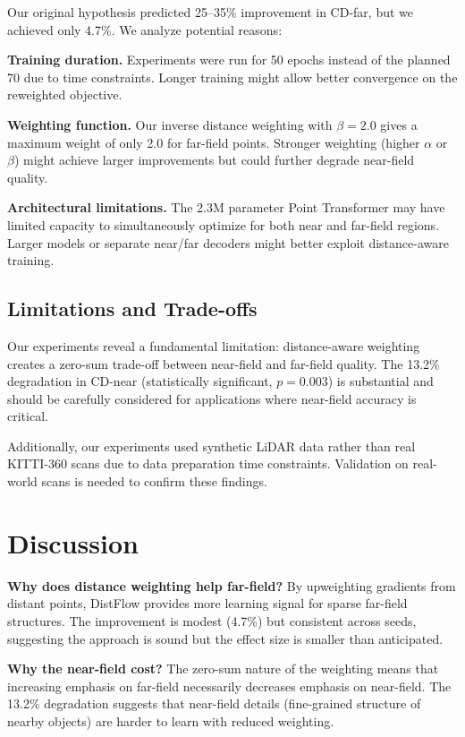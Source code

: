 \documentclass{article}
\begin{document}
Our original hypothesis predicted 25--35\% improvement in CD-far, but we achieved only 4.7\%. We analyze potential reasons:

\textbf{Training duration.} Experiments were run for 50 epochs instead of the planned 70 due to time constraints. Longer training might allow better convergence on the reweighted objective.

\textbf{Weighting function.} Our inverse distance weighting with $\beta=2.0$ gives a maximum weight of only 2.0 for far-field points. Stronger weighting (higher $\alpha$ or $\beta$) might achieve larger improvements but could further degrade near-field quality.

\textbf{Architectural limitations.} The 2.3M parameter Point Transformer may have limited capacity to simultaneously optimize for both near and far-field regions. Larger models or separate near/far decoders might better exploit distance-aware training.

\subsection{Limitations and Trade-offs}

Our experiments reveal a fundamental limitation: distance-aware weighting creates a zero-sum trade-off between near-field and far-field quality. The 13.2\% degradation in CD-near (statistically significant, $p=0.003$) is substantial and should be carefully considered for applications where near-field accuracy is critical.

Additionally, our experiments used synthetic LiDAR data rather than real KITTI-360 scans due to data preparation time constraints. Validation on real-world scans is needed to confirm these findings.

\section{Discussion}

\textbf{Why does distance weighting help far-field?} By upweighting gradients from distant points, DistFlow provides more learning signal for sparse far-field structures. The improvement is modest (4.7\%) but consistent across seeds, suggesting the approach is sound but the effect size is smaller than anticipated.

\textbf{Why the near-field cost?} The zero-sum nature of the weighting means that increasing emphasis on far-field necessarily decreases emphasis on near-field. The 13.2\% degradation suggests that near-field details (fine-grained structure of nearby objects) are harder to learn with reduced weighting.
\end{document}
